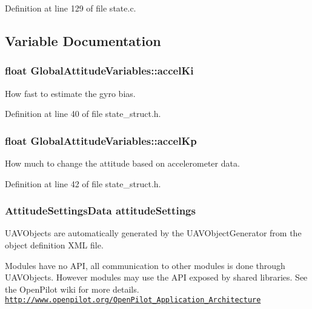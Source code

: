Definition at line 129 of file state.\-c.



\subsection{Variable Documentation}
\hypertarget{group___state_ga0a9a06d18d9d208192de6edeed98fbe8}{
\subsubsection[{accel\-Ki}]{\setlength{\rightskip}{0pt plus 5cm}float Global\-Attitude\-Variables\-::accel\-Ki}}\label{group___state_ga0a9a06d18d9d208192de6edeed98fbe8}


How fast to estimate the gyro bias. 



Definition at line 40 of file state\-\_\-struct.\-h.

\hypertarget{group___state_gaf9246ddec8582b6b47b752019c29b2e4}{
\subsubsection[{accel\-Kp}]{\setlength{\rightskip}{0pt plus 5cm}float Global\-Attitude\-Variables\-::accel\-Kp}}\label{group___state_gaf9246ddec8582b6b47b752019c29b2e4}


How much to change the attitude based on accelerometer data. 



Definition at line 42 of file state\-\_\-struct.\-h.

\hypertarget{group___state_ga8f6543ab52bafea6c0858baeeae8db59}{
\subsubsection[{attitude\-Settings}]{\setlength{\rightskip}{0pt plus 5cm}Attitude\-Settings\-Data attitude\-Settings}}\label{group___state_ga8f6543ab52bafea6c0858baeeae8db59}
U\-A\-V\-Objects are automatically generated by the U\-A\-V\-Object\-Generator from the object definition X\-M\-L file.

Modules have no A\-P\-I, all communication to other modules is done through U\-A\-V\-Objects. However modules may use the A\-P\-I exposed by shared libraries. See the Open\-Pilot wiki for more details. \href{http://www.openpilot.org/OpenPilot_Application_Architecture}{\tt http\-://www.\-openpilot.\-org/\-Open\-Pilot\-\_\-\-Application\-\_\-\-Architecture} 

